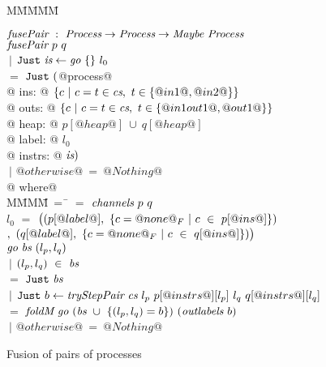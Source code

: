 
\begin{figure}

\begin{tabbing}
M\=M\=M\=M\=M\kill

$\textit{fusePair} ~:~ \textit{Process} \to \textit{Process} \to  \textit{Maybe}~\textit{Process}$ \\
$\textit{fusePair}~p~q$ \\
\> $~|$ \> $\texttt{Just}~ \textit{is} \gets \textit{go}~\{  \}~l_0$ \\
\> $=$ \> $\texttt{Just}~ ($@process@ \\
@             ins: @ $\{ c~|~c=t \in \textit{cs},~t \in \{ @in1@,@in2@ \} \} $ \\
@            outs: @ $\{ c~|~c=t \in \textit{cs},~t \in \{ @in1out1@,@out1@ \} \} $ \\
@            heap: @ $p[@heap@]~\cup~q[@heap@]$ \\
@           label: @ $l_0$ \\
@          instrs: @ $\textit{is})$ \\
\> $~|$ \> $@otherwise@~=~@Nothing@$ \\
@ where@ \\
M\=MM\=M\=~=~\=\kill
 \> \cs \> $=$ \> $\textit{channels}~p~q$ \\[0.5ex]

 \> $l_0$  \> $=$ \> $
      \big( 
      (p[@label@],~\{ c=@none@_F~|~c~\in~p[@ins@] \})$
\\ \> \> \>$
    ,~
      (q[@label@],~\{ c=@none@_F~|~c~\in~q[@ins@] \})
      \big)$ \\[0.5ex]

 \> $\textit{go}~\textit{bs}~(l_p,l_q)$ \\
 \> \> $~|$ \> $(l_p,l_q)~\in~\textit{bs}$ \\
 \> \> $=$ \> $\texttt{Just}~\textit{bs}$ \\
 \> \> $~|$ \> $\texttt{Just}~ b \gets \textit{tryStepPair}~\textit{cs}~l_p~p[@instrs@][l_p]~l_q~q[@instrs@][l_q]$ \\ 
 \> \> $=$ \> $\textit{foldM}~\textit{go}~(\textit{bs}~\cup~\{ (l_p,l_q)=b \})~(\textit{outlabels}~b)$ \\
 \> \> $~|$ \> $@otherwise@~=~@Nothing@$
\end{tabbing}

\caption{Fusion of pairs of processes}


\label{fig:Fusion:Def:Top}
\end{figure}



